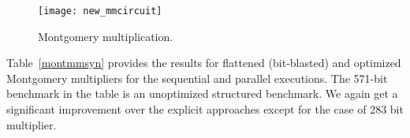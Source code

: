 \begin{figure}[H]
  \centering
  \texttt{[image: new\_mmcircuit]}
  \caption{Montgomery multiplication.}
  \label{montfig}
  \end{figure}
\vspace{-0.1in}
\par Table~\ref{montmmsyn} provides the results for flattened (bit-blasted) and optimized Montgomery multipliers for the sequential and parallel executions. 
The 571-bit benchmark in the table is an unoptimized structured benchmark. We again get a significant improvement over the explicit approaches except for the case of 283 bit multiplier. 


